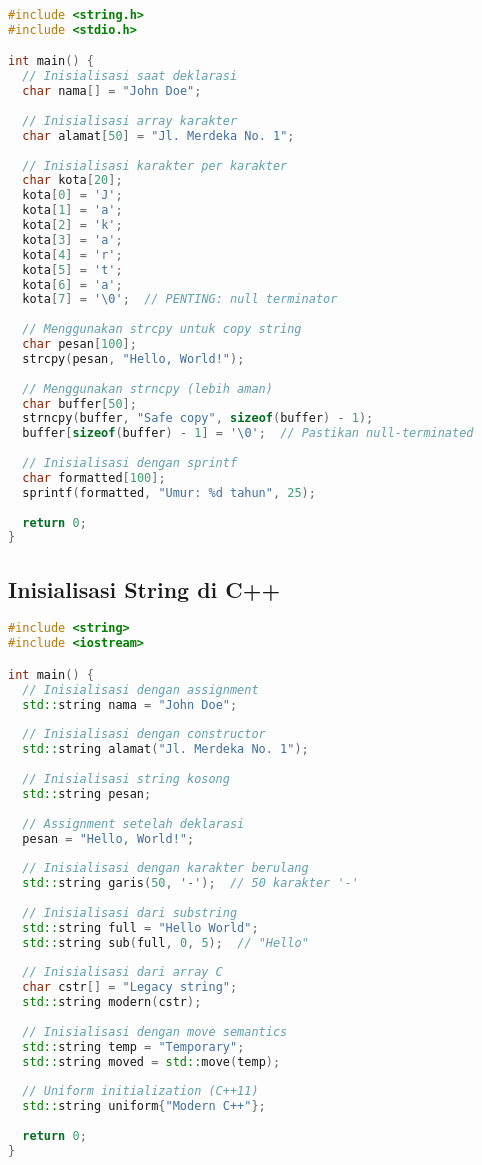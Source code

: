 \documentclass[../main.tex]{subfiles}
\begin{document}
\begin{lstlisting}[language=C, caption={Inisialisasi string di C}]
#include <string.h>
#include <stdio.h>

int main() {
  // Inisialisasi saat deklarasi
  char nama[] = "John Doe";
  
  // Inisialisasi array karakter
  char alamat[50] = "Jl. Merdeka No. 1";
  
  // Inisialisasi karakter per karakter
  char kota[20];
  kota[0] = 'J';
  kota[1] = 'a';
  kota[2] = 'k';
  kota[3] = 'a';
  kota[4] = 'r';
  kota[5] = 't';
  kota[6] = 'a';
  kota[7] = '\0';  // PENTING: null terminator
  
  // Menggunakan strcpy untuk copy string
  char pesan[100];
  strcpy(pesan, "Hello, World!");
  
  // Menggunakan strncpy (lebih aman)
  char buffer[50];
  strncpy(buffer, "Safe copy", sizeof(buffer) - 1);
  buffer[sizeof(buffer) - 1] = '\0';  // Pastikan null-terminated
  
  // Inisialisasi dengan sprintf
  char formatted[100];
  sprintf(formatted, "Umur: %d tahun", 25);
  
  return 0;
}
\end{lstlisting}

\subsection{Inisialisasi String di C++}

\begin{lstlisting}[language=C++, caption={Inisialisasi string di C++}]
#include <string>
#include <iostream>

int main() {
  // Inisialisasi dengan assignment
  std::string nama = "John Doe";
  
  // Inisialisasi dengan constructor
  std::string alamat("Jl. Merdeka No. 1");
  
  // Inisialisasi string kosong
  std::string pesan;
  
  // Assignment setelah deklarasi
  pesan = "Hello, World!";
  
  // Inisialisasi dengan karakter berulang
  std::string garis(50, '-');  // 50 karakter '-'
  
  // Inisialisasi dari substring
  std::string full = "Hello World";
  std::string sub(full, 0, 5);  // "Hello"
  
  // Inisialisasi dari array C
  char cstr[] = "Legacy string";
  std::string modern(cstr);
  
  // Inisialisasi dengan move semantics
  std::string temp = "Temporary";
  std::string moved = std::move(temp);
  
  // Uniform initialization (C++11)
  std::string uniform{"Modern C++"};
  
  return 0;
}
\end{lstlisting}
\end{document}
